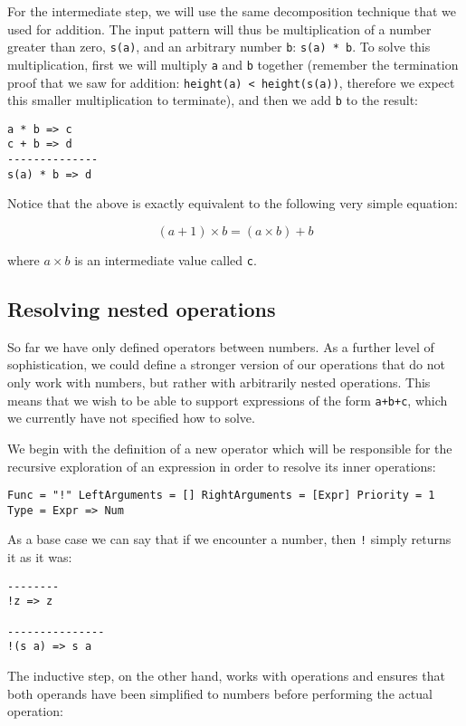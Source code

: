 For the intermediate step, we will use the same decomposition technique that we used for addition. The input pattern will thus be multiplication of a number greater than zero, \texttt{s(a)}, and an arbitrary number \texttt{b}: \texttt{s(a) * b}. To solve this multiplication, first we will multiply \texttt{a} and \texttt{b} together (remember the termination proof that we saw for addition: \texttt{height(a) < height(s(a))}, therefore we expect this smaller multiplication to terminate), and then we add \texttt{b} to the result:

\begin{lstlisting}
a * b => c
c + b => d
--------------
s(a) * b => d
\end{lstlisting}

Notice that the above is exactly equivalent to the following very simple equation:

$$(a+1) \times b = (a \times b) + b$$

where $a \times b$ is an intermediate value called \texttt{c}.


\subsection{Resolving nested operations}
So far we have only defined operators between numbers. As a further level of sophistication, we could define a stronger version of our operations that do not only work with numbers, but rather with arbitrarily nested operations. This means that we wish to be able to support expressions of the form \texttt{a+b+c}, which we currently have not specified how to solve.

We begin with the definition of a new operator which will be responsible for the recursive exploration of an expression in order to resolve its inner operations:

\begin{lstlisting}
Func = "!" LeftArguments = [] RightArguments = [Expr] Priority = 1 Type = Expr => Num
\end{lstlisting}

As a base case we can say that if we encounter a number, then \texttt{!} simply returns it as it was:

\begin{lstlisting}
--------
!z => z

---------------
!(s a) => s a
\end{lstlisting}

The inductive step, on the other hand, works with operations and ensures that both operands have been simplified to numbers before performing the actual operation:

